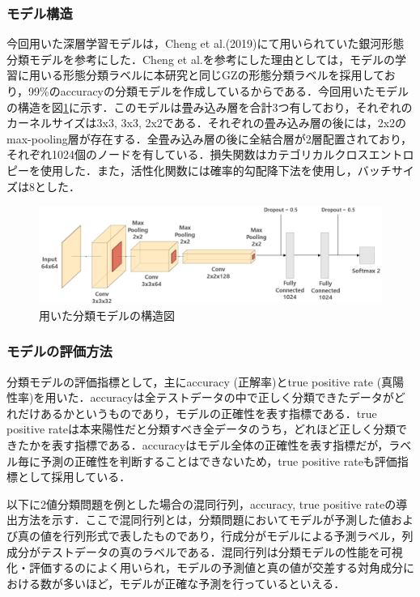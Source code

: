 \documentclass[a4j, 11pt]{jreport}
\begin{document}
\subsubsection{モデル構造}
今回用いた深層学習モデルは，Cheng et al.(2019)\cite{Cheng2019}にて用いられていた銀河形態分類モデルを参考にした．Cheng et al.を参考にした理由としては，モデルの学習に用いる形態分類ラベルに本研究と同じGZの形態分類ラベルを採用しており，99\%のaccuracyの分類モデルを作成しているからである．今回用いたモデルの構造を図\ref{fig:model_shape}に示す．このモデルは畳み込み層を合計3つ有しており，それぞれのカーネルサイズは3x3, 3x3, 2x2である．それぞれの畳み込み層の後には，2x2のmax-pooling層が存在する．全畳み込み層の後に全結合層が2層配置されており，それぞれ1024個のノードを有している．損失関数はカテゴリカルクロスエントロピーを使用した．また，活性化関数には確率的勾配降下法を使用し，バッチサイズは8とした．

\begin{figure}[h]
	\centering
	\includegraphics[width=14cm]{images/model_shape.png}
	\caption{用いた分類モデルの構造図}
	\label{fig:model_shape}
\end{figure}
 
\subsubsection{モデルの評価方法}
分類モデルの評価指標として，主にaccuracy (正解率)とtrue positive rate (真陽性率)を用いた．accuracyは全テストデータの中で正しく分類できたデータがどれだけあるかというものであり，モデルの正確性を表す指標である．true positive rateは本来陽性だと分類すべき全データのうち，どれほど正しく分類できたかを表す指標である．accuracyはモデル全体の正確性を表す指標だが，ラベル毎に予測の正確性を判断することはできないため，true positive rateも評価指標として採用している．

以下に2値分類問題を例とした場合の混同行列，accuracy, true positive rateの導出方法を示す．ここで混同行列とは，分類問題においてモデルが予測した値および真の値を行列形式で表したものであり，行成分がモデルによる予測ラベル，列成分がテストデータの真のラベルである．混同行列は分類モデルの性能を可視化・評価するのによく用いられ，モデルの予測値と真の値が交差する対角成分における数が多いほど，モデルが正確な予測を行っているといえる．
\end{document}
